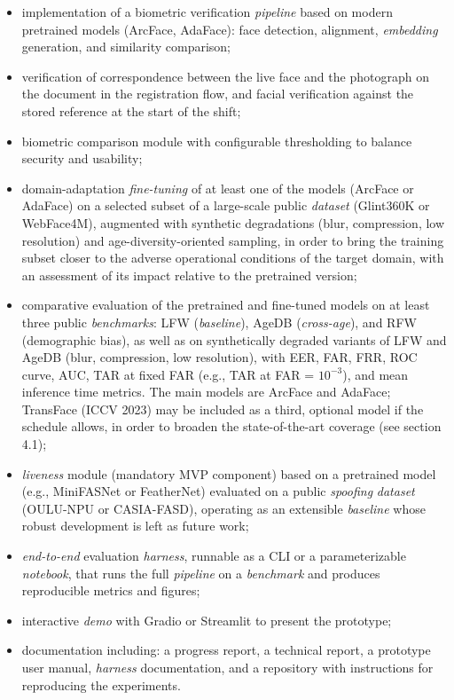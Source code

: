 \documentclass[
  11pt, %
]{charter}
\begin{document}
\begin{itemize}
  \item implementation of a biometric verification \textit{pipeline} based on modern pretrained models (ArcFace, AdaFace): face detection, alignment, \textit{embedding} generation, and similarity comparison;
  \item verification of correspondence between the live face and the photograph on the document in the registration flow, and facial verification against the stored reference at the start of the shift;
  \item biometric comparison module with configurable thresholding to balance security and usability;
  \item domain-adaptation \textit{fine-tuning} of at least one of the models (ArcFace or AdaFace) on a selected subset of a large-scale public \textit{dataset} (Glint360K or WebFace4M), augmented with synthetic degradations (blur, compression, low resolution) and age-diversity-oriented sampling, in order to bring the training subset closer to the adverse operational conditions of the target domain, with an assessment of its impact relative to the pretrained version;
  \item comparative evaluation of the pretrained and fine-tuned models on at least three public \textit{benchmarks}: LFW (\textit{baseline}), AgeDB (\textit{cross-age}), and RFW (demographic bias), as well as on synthetically degraded variants of LFW and AgeDB (blur, compression, low resolution), with EER, FAR, FRR, ROC curve, AUC, TAR at fixed FAR (e.g., TAR at FAR = $10^{-3}$), and mean inference time metrics. The main models are ArcFace and AdaFace; TransFace (ICCV 2023) may be included as a third, optional model if the schedule allows, in order to broaden the state-of-the-art coverage (see section 4.1);
  \item \textit{liveness} module (mandatory MVP component) based on a pretrained model (e.g., MiniFASNet or FeatherNet) evaluated on a public \textit{spoofing} \textit{dataset} (OULU-NPU or CASIA-FASD), operating as an extensible \textit{baseline} whose robust development is left as future work;
  \item \textit{end-to-end} evaluation \textit{harness}, runnable as a CLI or a parameterizable \textit{notebook}, that runs the full \textit{pipeline} on a \textit{benchmark} and produces reproducible metrics and figures;
  \item interactive \textit{demo} with Gradio or Streamlit to present the prototype;
  \item documentation including: a progress report, a technical report, a prototype user manual, \textit{harness} documentation, and a repository with instructions for reproducing the experiments.
\end{itemize}
\end{document}
